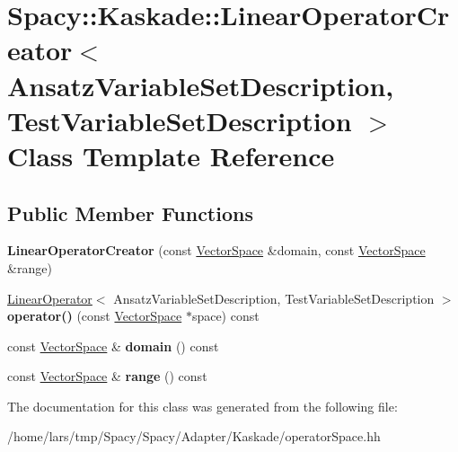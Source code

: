 \hypertarget{classSpacy_1_1Kaskade_1_1LinearOperatorCreator}{}\section{Spacy\+:\+:Kaskade\+:\+:Linear\+Operator\+Creator$<$ Ansatz\+Variable\+Set\+Description, Test\+Variable\+Set\+Description $>$ Class Template Reference}
\label{classSpacy_1_1Kaskade_1_1LinearOperatorCreator}
\subsection*{Public Member Functions}
\begin{DoxyCompactItemize}
\item 
{\bfseries Linear\+Operator\+Creator} (const \hyperlink{classSpacy_1_1VectorSpace}{Vector\+Space} \&domain, const \hyperlink{classSpacy_1_1VectorSpace}{Vector\+Space} \&range)\hypertarget{classSpacy_1_1Kaskade_1_1LinearOperatorCreator_a3cc4089037dcdf7e896b95d19063f56a}{}\label{classSpacy_1_1Kaskade_1_1LinearOperatorCreator_a3cc4089037dcdf7e896b95d19063f56a}

\item 
\hyperlink{classSpacy_1_1Kaskade_1_1LinearOperator}{Linear\+Operator}$<$ Ansatz\+Variable\+Set\+Description, Test\+Variable\+Set\+Description $>$ {\bfseries operator()} (const \hyperlink{classSpacy_1_1VectorSpace}{Vector\+Space} $\ast$space) const \hypertarget{classSpacy_1_1Kaskade_1_1LinearOperatorCreator_a7897a3843021097021854f7e1fcd938f}{}\label{classSpacy_1_1Kaskade_1_1LinearOperatorCreator_a7897a3843021097021854f7e1fcd938f}

\item 
const \hyperlink{classSpacy_1_1VectorSpace}{Vector\+Space} \& {\bfseries domain} () const \hypertarget{classSpacy_1_1Kaskade_1_1LinearOperatorCreator_ae5a94e31d885dcf4526737e5ab60e91a}{}\label{classSpacy_1_1Kaskade_1_1LinearOperatorCreator_ae5a94e31d885dcf4526737e5ab60e91a}

\item 
const \hyperlink{classSpacy_1_1VectorSpace}{Vector\+Space} \& {\bfseries range} () const \hypertarget{classSpacy_1_1Kaskade_1_1LinearOperatorCreator_ae36b9e5b49159981d712a1d7193f52f8}{}\label{classSpacy_1_1Kaskade_1_1LinearOperatorCreator_ae36b9e5b49159981d712a1d7193f52f8}

\end{DoxyCompactItemize}


The documentation for this class was generated from the following file\+:\begin{DoxyCompactItemize}
\item 
/home/lars/tmp/\+Spacy/\+Spacy/\+Adapter/\+Kaskade/operator\+Space.\+hh\end{DoxyCompactItemize}
